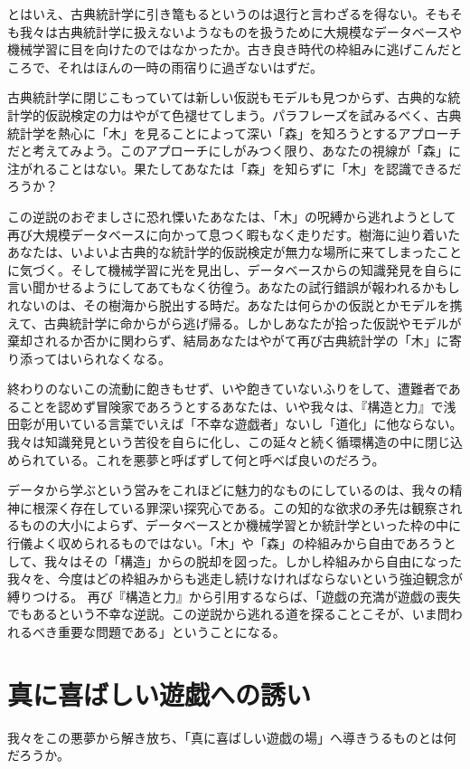 とはいえ、古典統計学に引き篭もるというのは退行と言わざるを得ない。そもそも我々は古典統計学に扱えないようなものを扱うために大規模なデータベースや機械学習に目を向けたのではなかったか。古き良き時代の枠組みに逃げこんだところで、それはほんの一時の雨宿りに過ぎないはずだ。

古典統計学に閉じこもっていては新しい仮説もモデルも見つからず、古典的な統計学的仮説検定の力はやがて色褪せてしまう。パラフレーズを試みるべく、古典統計学を熱心に「木」を見ることによって深い「森」を知ろうとするアプローチだと考えてみよう。このアプローチにしがみつく限り、あなたの視線が「森」に注がれることはない。果たしてあなたは「森」を知らずに「木」を認識できるだろうか？

この逆説のおぞましさに恐れ慄いたあなたは、「木」の呪縛から逃れようとして再び大規模データベースに向かって息つく暇もなく走りだす。樹海に辿り着いたあなたは、いよいよ古典的な統計学的仮説検定が無力な場所に来てしまったことに気づく。そして機械学習に光を見出し、データベースからの知識発見を自らに言い聞かせるようにしてあてもなく彷徨う。あなたの試行錯誤が報われるかもしれないのは、その樹海から脱出する時だ。あなたは何らかの仮説とかモデルを携えて、古典統計学に命からがら逃げ帰る。しかしあなたが拾った仮説やモデルが棄却されるか否かに関わらず、結局あなたはやがて再び古典統計学の「木」に寄り添ってはいられなくなる。

終わりのないこの流動に飽きもせず、いや飽きていないふりをして、遭難者であることを認めず冒険家であろうとするあなたは、いや我々は、『構造と力』で浅田彰が用いている言葉でいえば「不幸な遊戯者」ないし「道化」に他ならない。我々は知識発見という苦役を自らに化し、この延々と続く循環構造の中に閉じ込められている。これを悪夢と呼ばずして何と呼べば良いのだろう。

データから学ぶという営みをこれほどに魅力的なものにしているのは、我々の精神に根深く存在している罪深い探究心である。この知的な欲求の矛先は観察されるものの大小によらず、データベースとか機械学習とか統計学といった枠の中に行儀よく収められるものではない。「木」や「森」の枠組みから自由であろうとして、我々はその「構造」からの脱却を図った。しかし枠組みから自由になった我々を、今度はどの枠組みからも逃走し続けなければならないという強迫観念が縛りつける。
再び『構造と力』から引用するならば、「遊戯の充満が遊戯の喪失でもあるという不幸な逆説。この逆説から逃れる道を探ることこそが、いま問われるべき重要な問題である」ということになる。

\section{真に喜ばしい遊戯への誘い}
我々をこの悪夢から解き放ち、「真に喜ばしい遊戯の場」へ導きうるものとは何だろうか。

